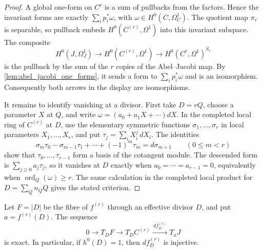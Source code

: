 \begin{proof}
  A global one-form on \(C^r\) is a sum of pullbacks from the factors.
  Hence the invariant forms are exactly
  \(\sum_i p_i^*\omega\), with \(\omega\in H^0(C,\Omega_C^1)\).
  The quotient map \(\pi_r\) is separable, so pullback embeds
  \(H^0(C^{(r)},\Omega^1)\) into this invariant subspace.  The composite
  \[
    H^0(J,\Omega_J^1)\longrightarrow H^0(C^{(r)},\Omega^1)
      \longrightarrow H^0(C^r,\Omega^1)^{S_r}
  \]
  is the pullback by the sum of the \(r\) copies of the Abel--Jacobi map.
  By \cref{lem:abel_jacobi_one_forms}, it sends a form to
  \(\sum_i p_i^*\omega\) and is an isomorphism.  Consequently both arrows
  in the display are isomorphisms.

  It remains to identify vanishing at a divisor.  First take \(D=rQ\),
  choose a parameter \(X\) at \(Q\), and write
  \(\omega=(a_0+a_1X+\cdots)dX\).  In the completed local ring of
  \(C^{(r)}\) at \(D\), use the elementary symmetric functions
  \(\sigma_1,\ldots,\sigma_r\) in local parameters
  \(X_1,\ldots,X_r\), and put
  \(\tau_j=\sum_iX_i^j\,dX_i\).  The identities
  \[
    \sigma_m\tau_0-\sigma_{m-1}\tau_1+\cdots+(-1)^m\tau_m
      =d\sigma_{m+1}
      \qquad(0\le m<r)
  \]
  show that \(\tau_0,\ldots,\tau_{r-1}\) form a basis of the cotangent
  module.  The descended form is \(\sum_{j\ge0}a_j\tau_j\), so it
  vanishes at \(D\) exactly when
  \(a_0=\cdots=a_{r-1}=0\), equivalently when
  \(\operatorname{ord}_Q(\omega)\ge r\).  The same calculation in the
  completed local product for
  \(D=\sum_Q n_QQ\) gives the stated criterion.
\end{proof}

\begin{lemma}
  \label{lem:symmetric_product_tangent_exact}

  Let \(F=|D|\) be the fibre of \(f^{(r)}\) through an effective divisor
  \(D\), and put \(a=f^{(r)}(D)\).  The sequence
  \[
    0\longrightarrow T_DF\longrightarrow T_DC^{(r)}
      \xrightarrow{\,d f^{(r)}_D\,}T_aJ
  \]
  is exact.  In particular, if \(h^0(D)=1\), then
  \(d f^{(r)}_D\) is injective.
\end{lemma}


